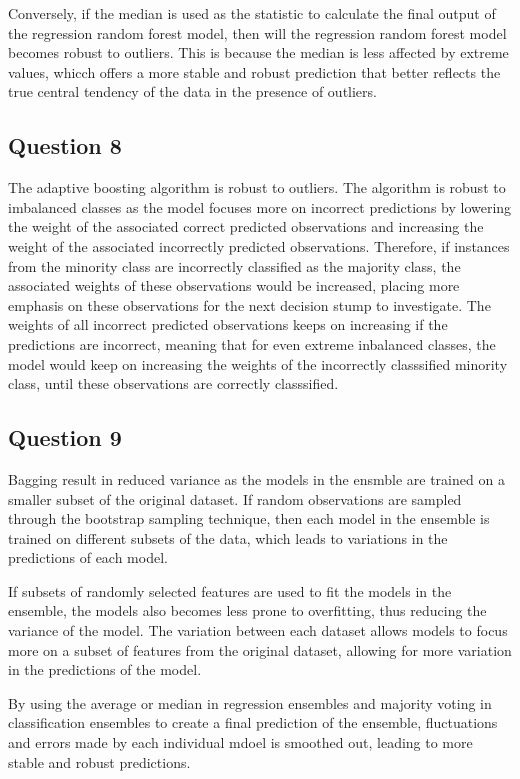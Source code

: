 \documentclass[10pt]{article}
\begin{document}
Conversely, if the median is used as the statistic to calculate the final output of the regression random forest model,
then will the regression random forest model becomes robust to outliers.
This is because the median is less affected by extreme values, whicch offers a more stable and robust prediction that
better reflects the true central tendency of the data in the presence of outliers.

\subsection*{Question 8}

The adaptive boosting algorithm is robust to outliers. The algorithm is robust to imbalanced classes
as the model focuses more on incorrect predictions by lowering the weight of the associated correct predicted observations
and increasing the weight of the associated incorrectly predicted observations. Therefore, if instances from the minority
class are incorrectly classified as the majority class, the associated weights of these observations would be increased, placing
more emphasis on these observations for the next decision stump to investigate. The weights of all incorrect predicted
observations keeps on increasing if the predictions are incorrect, meaning that for even extreme inbalanced classes, the
model would keep on increasing the weights of the incorrectly classsified minority class, until these observations
are correctly classsified.

\subsection*{Question 9}

Bagging result in reduced variance as the models in the ensmble are trained on a smaller
subset of the original dataset. If random observations are sampled through the bootstrap
sampling technique, then each model in the ensemble is trained on different subsets of the data,
which leads to variations in the predictions of each model.

If subsets of randomly selected features are used to fit the models in the ensemble, the models also becomes less prone
to overfitting, thus reducing the variance of the model. The variation between each dataset allows models to focus more
on a subset of features from the original dataset, allowing for more variation in the predictions of the model.

By using the average or median in regression ensembles and majority voting in classification ensembles to create
a final prediction of the ensemble, fluctuations and errors made by each individual mdoel is smoothed out,
leading to more stable and robust predictions.
\end{document}
